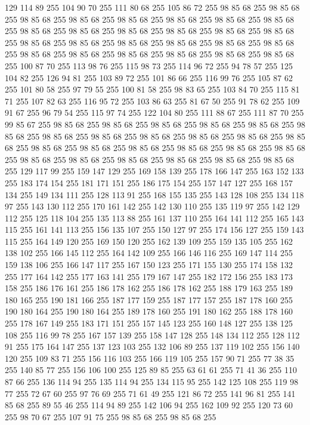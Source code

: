 129 114 89 255 104 90 70 255 111 80 68 255 105 86 72 255 98 85 68 255 98 85 68 255 98 85 68 255 98 85 68 255 98 85 68 255 98 85 68 255 98 85 68 255 98 85 68 255 98 85 68 255 98 85 68 255 98 85 68 255 98 85 68 255 98 85 68 255 98 85 68 255 98 85 68 255 98 85 68 255 98 85 68 255 98 85 68 255 98 85 68 255 98 85 68 255 98 85 68 255 98 85 68 255 98 85 68 255 98 85 68 255 98 85 68 255 98 85 68 255 100 87 70 255 113 98 76 255 115 98 73 255 114 96 72 255 94 78 57 255 125 104 82 255 126 94 81 255 103 89 72 255 101 86 66 255 116 99 76 255 105 87 62 255 101 80 58 255 97 79 55 255 100 81 58 255 98 83 65 255 103 84 70 255 115 81 71 255 107 82 63 255 116 95 72 255 103 86 63 255 81 67 50 255 91 78 62 255 109 91 67 255 96 79 54 255 115 97 74 255 122 104 80 255 111 88 67 255 111 87 70 255 99 85 67 255 98 85 68 255 98 85 68 255 98 85 68 255 98 85 68 255 98 85 68 255
98 85 68 255 98 85 68 255 98 85 68 255 98 85 68 255 98 85 68 255 98 85 68 255 98 85 68 255 98 85 68 255 98 85 68 255 98 85 68 255 98 85 68 255 98 85 68 255 98 85 68 255 98 85 68 255 98 85 68 255 98 85 68 255 98 85 68 255 98 85 68 255 98 85 68 255 129 117 99 255 159 147 129 255 169 158 139 255 178 166 147 255 163 152 133 255 183 174 154 255 181 171 151 255 186 175 154 255 157 147 127 255 168 157 134 255 149 134 111 255 128 113 91 255 168 155 135 255 143 128 108 255 134 118 97 255 143 130 112 255 170 161 142 255 142 130 110 255 135 119 97 255 142 129 112 255 125 118 104 255 135 113 88 255 161 137 110 255 164 141 112 255 165 143 115 255 161 141 113 255 156 135 107 255 150 127 97 255 174 156 127 255 159 143 115 255 164 149 120 255 169 150 120 255 162 139 109 255 159 135 105 255 162 138 102 255 166 145 112 255 164 142 109 255 166 146 116 255 169 147 114 255 159 138 106 255 166 147 117 255 167 150 123 255 171 155 130 255 174 158 132 255 177 164 142 255
177 163 141 255 179 167 147 255 182 172 156 255 183 173 158 255 186 176 161 255 186 178 162 255 186 178 162 255 188 179 163 255 189 180 165 255 190 181 166 255 187 177 159 255 187 177 157 255 187 178 160 255 190 180 164 255 190 180 164 255 189 178 160 255 191 180 162 255 188 178 160 255 178 167 149 255 183 171 151 255 157 145 123 255 160 148 127 255 138 125 108 255 116 99 78 255 167 157 139 255 158 147 128 255 148 134 112 255 128 112 91 255 175 164 147 255 137 123 103 255 132 106 89 255 137 119 102 255 156 140 120 255 109 83 71 255 156 116 103 255 166 119 105 255 157 90 71 255 77 38 35 255 140 85 77 255 156 106 100 255 125 89 85 255 63 61 61 255 71 41 36 255 110 87 66 255 136 114 94 255 135 114 94 255 134 115 95 255 142 125 108 255 119 98 77 255 72 67 60 255 97 76 69 255 71 61 49 255 121 86 72 255 141 96 81 255 141 85 68 255 89 55 46 255 114 94 89 255 142 106 94 255 162 109 92 255 120 73 60 255 98 70 67 255 107 91 75 255 98 85 68 255 98 85 68 255
